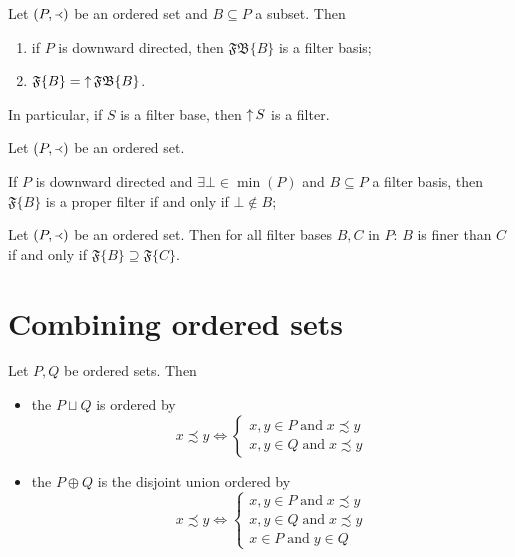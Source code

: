 \begin{proposition}
Let $\left( P,\Yleft \right)$ be an ordered set and $B\subseteq P$ a subset. Then
\begin{enumerate}
\item if $P$ is downward directed, then $\mathfrak{FB}\{B\}$ is a filter basis;
\item $\mathfrak{F}\{B\} = \mathop{\uparrow}\mathfrak{FB}\{B\}$.
\end{enumerate}
\end{proposition}
In particular, if $S$ is a filter base, then $\mathop{\uparrow} S$ is a filter.

\begin{lemma}
Let $\left( P,\Yleft \right)$ be an ordered set.

If $P$ is downward directed and $\exists \bot \in \min(P)$ and $B \subseteq P$ a filter basis, then $\mathfrak{F}\{B\}$ is a proper filter \textup{if and only if} $\bot \notin B$; 
\end{lemma}

\begin{proposition}
Let $\left( P,\Yleft \right)$ be an ordered set. Then for all filter bases $B,C$ in $P$: $B$ is finer than $C$ \textup{if and only if} $\mathfrak{F}\{B\} \supseteq \mathfrak{F}\{C\}$.
\end{proposition}

\section{Combining ordered sets}
\begin{definition}
Let $P,Q$ be ordered sets. Then
\begin{itemize}
\item the  $P\sqcup Q$ is ordered by
\[ x\precsim y \iff \begin{cases}
x,y\in P \;\text{and}\; x\precsim y \\
x,y\in Q \;\text{and}\; x\precsim y
\end{cases} \]
\item the  $P\oplus Q$ is the disjoint union ordered by
\[ x\precsim y \iff \begin{cases}
x,y\in P \;\text{and}\; x\precsim y \\
x,y\in Q \;\text{and}\; x\precsim y \\
x\in P \;\text{and}\; y\in Q
\end{cases} \]
\end{itemize}
\end{definition}

